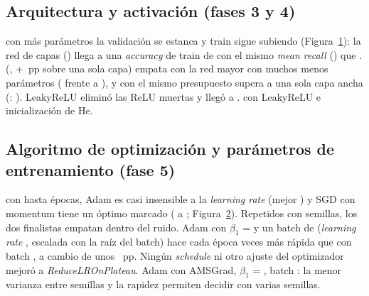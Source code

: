 \subsection{Arquitectura y activación (fases 3 y 4)}
{con más parámetros la validación se estanca y train sigue subiendo (Figura~\ref{fig:capacity}): la red de
 capas () llega a una \emph{accuracy} de train de
 con el mismo \emph{mean recall} () que .}
{ (, +~pp sobre una sola capa) empata con la red mayor con
muchos menos parámetros ( frente a ), y con el mismo presupuesto supera a una
sola capa ancha (: ). LeakyReLU eliminó las ReLU muertas y llegó a
.}
{ con LeakyReLU e inicialización de He.}

\begin{figure}[!htbp]
  \centering
  \begin{minipage}[t]{0.485\linewidth}
    \centering
    \caption{}
    \label{fig:resolution}
  \end{minipage}\hfill
  \begin{minipage}[t]{0.485\linewidth}
    \centering
    \caption{}
    \label{fig:capacity}
  \end{minipage}
\end{figure}

\subsection{Algoritmo de optimización y parámetros de entrenamiento (fase 5)}
{con hasta  épocas, Adam es casi insensible a la \emph{learning rate}
(mejor ) y SGD con momentum tiene un óptimo marcado ( a
; Figura~\ref{fig:lr}). Repetidos con  semillas, los dos finalistas
empatan dentro del ruido.}
{Adam con $\beta_1$ =  y un batch de  (\emph{learning rate} , escalada
con la raíz del batch) hace cada época  veces más rápida que con batch , a
cambio de unos ~pp. Ningún \emph{schedule} ni otro ajuste del optimizador mejoró a
\emph{ReduceLROnPlateau}.}
{Adam con AMSGrad, $\beta_1$ = , batch : la menor varianza entre semillas y la
rapidez permiten decidir con varias semillas.}

\begin{figure}[!htbp]
  \centering
  \caption{}
  \label{fig:lr}
\end{figure}

